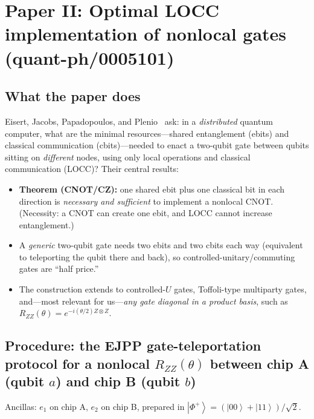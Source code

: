 \documentclass[11pt]{article}
\newcommand{\ket}[1]{\left|#1\right\rangle}
\newcommand{\RZZ}{R_{ZZ}}
\begin{document}
\section{Paper II: Optimal LOCC implementation of nonlocal gates
(quant-ph/0005101)}
\label{sec:locc}

\subsection{What the paper does}

Eisert, Jacobs, Papadopoulos, and Plenio~\cite{eisert2000} ask: in a
\emph{distributed} quantum computer, what are the minimal resources---shared
entanglement (ebits) and classical communication (cbits)---needed to enact a
two-qubit gate between qubits sitting on \emph{different} nodes, using only
local operations and classical communication (LOCC)? Their central results:

\begin{itemize}[leftmargin=2em]
  \item \textbf{Theorem (CNOT/CZ):} one shared ebit plus one classical bit in
        each direction is \emph{necessary and sufficient} to implement a
        nonlocal CNOT. (Necessity: a CNOT can create one ebit, and LOCC cannot
        increase entanglement.)
  \item A \emph{generic} two-qubit gate needs two ebits and two cbits each way
        (equivalent to teleporting the qubit there and back), so
        controlled-unitary/commuting gates are ``half price.''
  \item The construction extends to controlled-$U$ gates, Toffoli-type
        multiparty gates, and---most relevant for us---\emph{any gate diagonal
        in a product basis}, such as
        $\RZZ(\theta) = e^{-i(\theta/2) Z\otimes Z}$.
\end{itemize}

\subsection{Procedure: the EJPP gate-teleportation protocol for a nonlocal
$\RZZ(\theta)$ between chip A (qubit $a$) and chip B (qubit $b$)}
\label{sec:ejpp}

Ancillas: $e_1$ on chip A, $e_2$ on chip B, prepared in
$\ket{\Phi^+} = (\ket{00}+\ket{11})/\sqrt{2}$.
\end{document}
